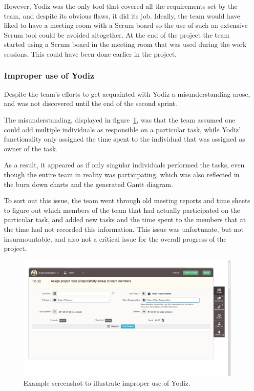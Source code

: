 However, Yodiz was the only tool that covered all the requirements set by the team, and despite its obvious flaws, it did its job. Ideally, the team would have liked to have a meeting room with a Scrum board so the use of such an extensive Scrum tool could be avoided altogether. At the end of the project the team started using a Scrum board in the meeting room that was used during the work sessions. This could have been done earlier in the project.

\subsubsection{Improper use of Yodiz}
\label{sec:improperScrum}
Despite the team's efforts to get acquainted with Yodiz a misunderstanding arose, and was not discovered until the end of the second sprint.

The misunderstanding, displayed in figure~\ref{fig:wrongUse}, was that the team
assumed one could add multiple individuals as responsible on a particular task,
while Yodiz' functionality only assigned the time spent to the individual that was assigned as owner of the task.

As a result, it appeared as if only singular individuals performed the tasks,
even though the entire team in reality was participating, which was also
reflected in the burn down charts and the generated Gantt diagram. 

To sort out this issue, the team went through old meeting reports and time sheets
to figure out which members of the team that had actually participated on the
particular task, and added new tasks and the time spent to the members that at
the time had not recorded this information.%
 This issue was unfortunate, but not insurmountable, and also not a critical
issue for the overall progress of the project.

\begin{figure}[H]
\includegraphics[width=\textwidth, clip, trim=1cm 2cm 4cm 1cm]{ch/retrospect/fig/wrongUse.png}
\caption{Example screenshot to illustrate improper use of Yodiz.}
\label{fig:wrongUse}
\end{figure}
